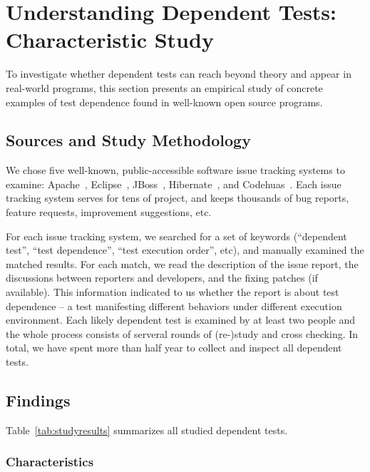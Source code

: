 \section{Understanding Dependent Tests: Characteristic Study}
\label{sec:study}

To investigate whether dependent tests can reach beyond theory
and appear in real-world programs, this section presents an empirical
study of concrete examples of test dependence found in
well-known open source programs. 


\subsection{Sources and Study Methodology}

We chose five well-known, public-accessible software issue
tracking systems to examine: Apache~\cite{apachebug},
Eclipse~\cite{eclipsebug}, JBoss~\cite{jbossbug},
Hibernate~\cite{hibernatebug}, and Codehuas~\cite{codehuasbug}.
Each issue tracking system serves for tens of project, and
keeps thousands of bug reports, feature requests, improvement
suggestions, etc.

For each issue tracking system, we searched for a set of keywords
(``dependent test'', ``test dependence'', ``test execution order'',
etc), and manually examined the matched results. For each match, we read the
description of the issue report, the discussions between reporters
and developers, and the fixing patches (if available). This information
indicated to us whether the report is about test dependence
-- a test manifesting different behaviors under different execution
environment. Each likely dependent test is examined by
at least two people and the whole process consists of serveral
rounds of (re-)study and cross checking. In total,
we have spent more than half year to collect and inspect all dependent
tests. 


\subsection{Findings}



Table~\ref{tab:studyresults} summarizes all studied dependent tests.


\subsubsection{Characteristics}

